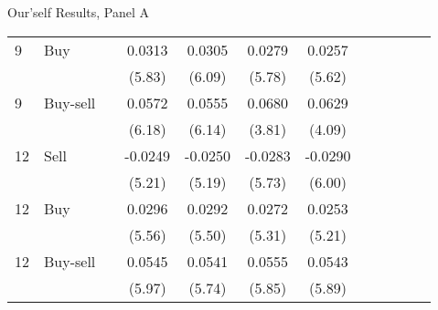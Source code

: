 \documentclass{beamer}
\begin{document}
\begin{frame}{Our'self Results, Panel A}
\begin{table}
\begin{tabular}{llrSSSScSSSS}
			9  & Buy      &    & 0.0313                & 0.0305                & 0.0279                & 0.0257                 \\
			   &          &    & (5.83)                & (6.09)                & (5.78)                & (5.62)                 \\
			9  & Buy-sell &    & 0.0572                & 0.0555                & 0.0680                & 0.0629                 \\
			   &          &    & (6.18)                & (6.14)                & (3.81)                & (4.09)                 \\
			12 & Sell     &    & -0.0249               & -0.0250               & -0.0283               & -0.0290                \\
			   &          &    & (5.21)                & (5.19)                & (5.73)                & (6.00)                 \\
			12 & Buy      &    & 0.0296                & 0.0292                & 0.0272                & 0.0253                 \\
			   &          &    & (5.56)                & (5.50)                & (5.31)                & (5.21)                 \\
			12 & Buy-sell &    & 0.0545                & 0.0541                & 0.0555                & 0.0543                 \\
			   &          &    & (5.97)                & (5.74)                & (5.85)                & (5.89)                 \\
			\bottomrule
		\end{tabular}
	\end{table}
\end{frame}
\end{document}
